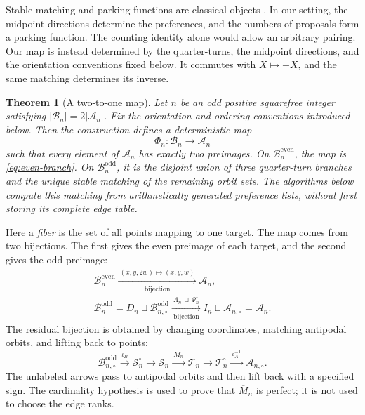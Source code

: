 \documentclass[11pt]{amsart}
\newtheorem{theorem}{Theorem}[section]
\theoremstyle{definition}
\theoremstyle{remark}
\newcommand{\Bn}{\mathcal B_n}
\newcommand{\An}{\mathcal A_n}
\newcommand{\Bodd}{\mathcal B_n^{\mathrm{odd}}}
\newcommand{\Beven}{\mathcal B_n^{\mathrm{even}}}
\newcommand{\Boddres}{\mathcal B_{n,\circ}^{\mathrm{odd}}}
\newcommand{\Ares}{\mathcal A_{n,\circ}}
\newcommand{\Sres}{\mathcal S_n^{\circ}}
\newcommand{\Tres}{\mathcal T_n^{\circ}}
\newcommand{\Sbar}{\overline{\mathcal S}_n}
\newcommand{\Tbar}{\overline{\mathcal T}_n}
\begin{document}
Stable matching and parking functions are classical objects
\cite{GaleShapley,GusfieldIrving,KonheimWeiss,StanleyParking}.  In our setting,
the midpoint directions determine the preferences, and the numbers of
proposals form a parking function.  The counting identity alone would allow
an arbitrary pairing.  Our map is instead determined by the quarter-turns,
the midpoint directions, and the orientation conventions fixed below.  It
commutes with $X\mapsto-X$, and the same matching determines its inverse.

\begin{theorem}[A two-to-one map]\label{thm:main}
Let $n$ be an odd positive squarefree integer satisfying
$|\Bn|=2|\An|$.  Fix the orientation and ordering conventions introduced
below.  Then the construction defines a deterministic map
\[
 \Phi_n:\Bn\longrightarrow\An
\]
such that every element of $\An$ has exactly two preimages.  On $\Beven$, the
map is \eqref{eq:even-branch}.  On $\Bodd$, it is the disjoint union of three
quarter-turn branches and the unique stable matching of the remaining orbit
sets.  The algorithms below compute this matching from arithmetically
generated preference lists, without first storing its complete edge table.
\end{theorem}

Here a \emph{fiber} is the set of all points mapping to one target.  The map
comes from two bijections.  The first gives the even preimage of each target,
and the second gives the odd preimage:
\begin{equation}\label{eq:master-map}
\begin{gathered}
 \Beven\xrightarrow[\text{bijection}]{\ (x,y,2w)\mapsto(x,y,w)\ }\An,
 \\[4pt]
 \Bodd=D_n\sqcup\Boddres
 \xrightarrow[\text{bijection}]{\ \Lambda_n\,\sqcup\,\Psi_n^{\circ}\ }
 I_n\sqcup\Ares=\An.
\end{gathered}
\end{equation}
The residual bijection is obtained by changing coordinates, matching
antipodal orbits, and lifting back to points:
\begin{equation}\label{eq:residual-flow}
 \Boddres\xrightarrow{\ \iota_B\ }\Sres
 \longrightarrow\Sbar
 \xrightarrow{\ \overline M_n\ }\Tbar
 \longrightarrow\Tres
 \xrightarrow{\ \iota_A^{-1}\ }\Ares.
\end{equation}
The unlabeled arrows pass to antipodal orbits and then lift back with a
specified sign.  The cardinality hypothesis is used to prove that
$\overline M_n$ is perfect; it is not used to choose the edge ranks.
\end{document}
